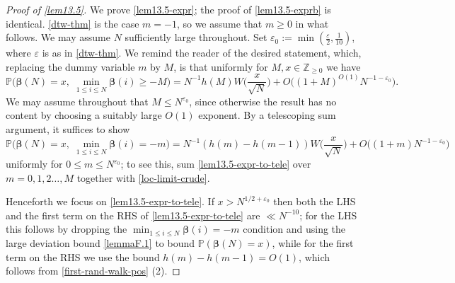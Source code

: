 \documentclass[11pt,reqno]{amsart}
\numberwithin{equation}{section}
\theoremstyle{definition}
\theoremstyle{remark}
\newcommand{\mb}{\mathbb}
\newcommand{\eps}{\varepsilon}
\def\boldbeta{\boldsymbol\beta}
\renewcommand{\le}{\leqslant}
\renewcommand{\ge}{\geqslant}
\newcommand\Z{\mathbb{Z}}
\begin{document}
\begin{proof}[Proof of \cref{lem13.5}] We prove \cref{lem13.5-expr}; the proof of \cref{lem13.5-exprb} is identical. \cref{dtw-thm} is the case $m = -1$, so we assume that $m \ge 0$ in what follows. We may assume $N$ sufficiently large throughout. Set $\eps_0 := \min(\frac{\eps}{2}, \frac{1}{10})$, where $\eps$ is as in \cref{dtw-thm}.  We remind the reader of the desired statement, which, replacing the dummy variable $m$ by $M$, is that uniformly for $M, x\in \Z_{\ge 0}$ we have
\begin{equation*} \mb{P} \big(\boldbeta(N) = x,\; \min_{1 \le i \le N} \boldbeta(i) \ge -M\big) = N^{-1} h(M) W\big(\frac{x}{\sqrt{N}}\big) + O\big((1 + M)^{O(1)} N^{-1 - \eps_0}\big).\end{equation*}
 We may assume throughout that $M \le N^{\eps_0}$, since otherwise the result has no content by choosing a suitably large $O(1)$ exponent.
By a telescoping sum argument, it suffices to show 
\begin{equation}\label{lem13.5-expr-to-tele} \mb{P} \big(\boldbeta(N) = x,\; \min_{1 \le i \le N} \boldbeta(i) = -m\big) = N^{-1} (h(m) - h(m-1)) W\big(\frac{x}{\sqrt{N}}\big) + O \big( (1 + m) N^{-1 - \eps_0}\big)\end{equation} uniformly for $0 \le m \le N^{\eps_0}$; to see this, sum \cref{lem13.5-expr-to-tele} over $m = 0,1,2\dots, M$ together with \cref{loc-limit-crude}. 

Henceforth we focus on \cref{lem13.5-expr-to-tele}. If $x > N^{1/2 + \eps_0}$ then both the LHS and the first term on the RHS of \cref{lem13.5-expr-to-tele} are $\ll N^{-10}$; for the LHS this follows by dropping the $\min_{1 \le i \le N} \boldbeta(i) = -m$ condition and using the large deviation bound \cref{lemmaF.1} to bound $\mb{P}(\boldbeta(N) = x)$, while for the first term on the RHS we use the bound $h(m) - h(m-1) = O(1)$, which follows from \cref{first-rand-walk-pos} (2). 


\end{proof}
\end{document}
